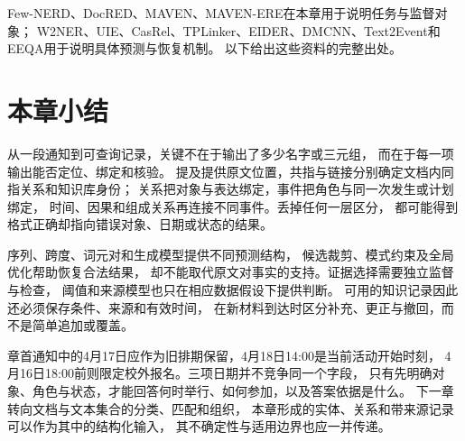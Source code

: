 Few-NERD、DocRED、MAVEN、MAVEN-ERE在本章用于说明任务与监督对象；
W2NER、UIE、CasRel、TPLinker、EIDER、DMCNN、Text2Event和EEQA用于说明具体预测与恢复机制。
以下给出这些资料的完整出处。
\begin{fullwidth}
  \small
  \noindent{}\par\medskip
  \noindent{}\par\medskip
  \noindent{}\par\medskip
  \noindent{}\par\medskip
  \noindent{}\par\medskip
  \noindent{}\par\medskip
  \noindent{}\par\medskip
  \noindent{}\par\medskip
  \noindent{}\par\medskip
  \noindent{}\par\medskip
  \noindent{}\par\medskip
  \noindent{}
\end{fullwidth}

\section{本章小结}
\label{sec:nlp-extraction-summary}

从一段通知到可查询记录，关键不在于输出了多少名字或三元组，
而在于每一项输出能否定位、绑定和核验。
提及提供原文位置，共指与链接分别确定文档内同指关系和知识库身份；
关系把对象与表达绑定，事件把角色与同一次发生或计划绑定，
时间、因果和组成关系再连接不同事件。丢掉任何一层区分，
都可能得到格式正确却指向错误对象、日期或状态的结果。

序列、跨度、词元对和生成模型提供不同预测结构，
候选裁剪、模式约束及全局优化帮助恢复合法结果，
却不能取代原文对事实的支持。证据选择需要独立监督与检查，
阈值和来源模型也只在相应数据假设下提供判断。
可用的知识记录因此还必须保存条件、来源和有效时间，
在新材料到达时区分补充、更正与撤回，而不是简单追加或覆盖。

章首通知中的4月17日应作为旧排期保留，4月18日14:00是当前活动开始时刻，
4月16日18:00前则限定校外报名。三项日期并不竞争同一个字段，
只有先明确对象、角色与状态，才能回答何时举行、如何参加，以及答案依据是什么。
下一章转向文档与文本集合的分类、匹配和组织，
本章形成的实体、关系和带来源记录可以作为其中的结构化输入，
其不确定性与适用边界也应一并传递。
